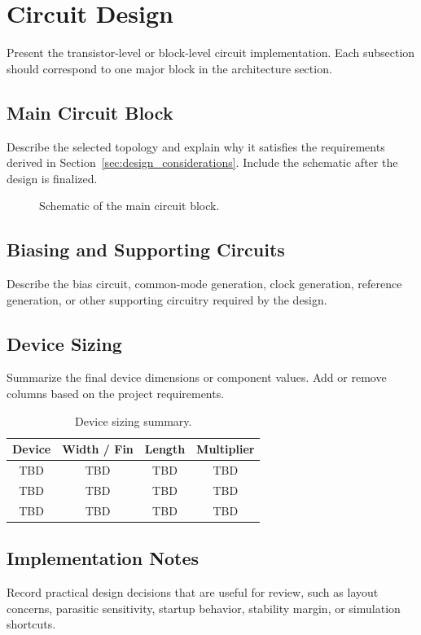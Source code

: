 \section{Circuit Design}
\label{sec:circuit_design}

Present the transistor-level or block-level circuit implementation. Each
subsection should correspond to one major block in the architecture section.

\subsection{Main Circuit Block}

Describe the selected topology and explain why it satisfies the requirements
derived in Section~\ref{sec:design_considerations}. Include the schematic after
the design is finalized.

\begin{figure}[H]
    \centering
    \caption{Schematic of the main circuit block.}
    \label{fig:main_circuit}
\end{figure}

\subsection{Biasing and Supporting Circuits}

Describe the bias circuit, common-mode generation, clock generation, reference
generation, or other supporting circuitry required by the design.

\subsection{Device Sizing}

Summarize the final device dimensions or component values. Add or remove columns
based on the project requirements.

\begin{table}[H]
    \centering
    \caption{Device sizing summary.}
    \label{tab:device_sizing}
    \renewcommand{\arraystretch}{1.2}
    \begin{tabular}{c c c c}
        \toprule
        \textbf{Device} & \textbf{Width / Fin} & \textbf{Length} & \textbf{Multiplier} \\
        \midrule
        TBD & TBD & TBD & TBD \\
        TBD & TBD & TBD & TBD \\
        TBD & TBD & TBD & TBD \\
        \bottomrule
    \end{tabular}
\end{table}

\subsection{Implementation Notes}

Record practical design decisions that are useful for review, such as layout
concerns, parasitic sensitivity, startup behavior, stability margin, or simulation
shortcuts.
